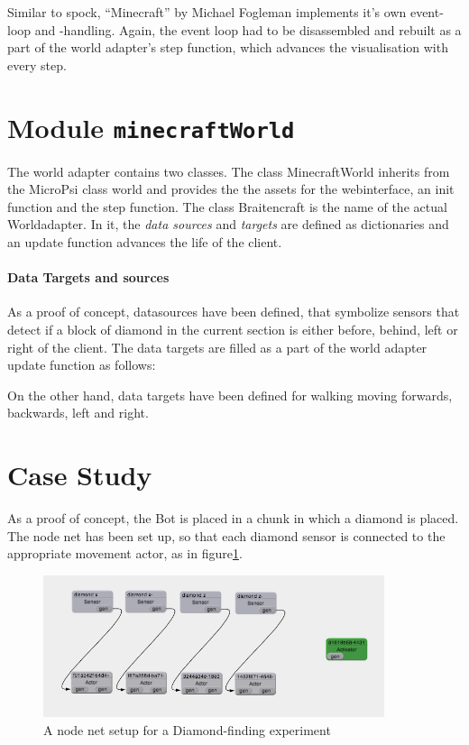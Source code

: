 Similar to spock, ``Minecraft'' by Michael Fogleman implements it's own event-loop and -handling. Again, the event loop had to be disassembled and rebuilt as a part of the world adapter's step function, which advances the visualisation with every step.

    \section{Module \texttt{minecraftWorld}}
The world adapter contains two classes. The class MinecraftWorld inherits from the MicroPsi class world and provides the the assets for the webinterface, an init function and the step function. The class Braitencraft is the name of the actual Worldadapter. In it, the \emph{data sources} and \emph{targets} are defined as dictionaries and an update function advances the life of the client.
    
\paragraph{Data Targets and sources}

As a proof of concept, datasources have been defined, that symbolize sensors that detect if a block of diamond in the current section is either before, behind, left or right of the client. The data targets are filled as a part of the world adapter update function as follows:

On the other hand, data targets have been defined for walking moving forwards, backwards, left and right.


    \section{Case Study}
As a proof of concept, the Bot is placed in a chunk in which a diamond is placed. The node net has been set up, so that each diamond sensor is connected to the appropriate movement actor, as in figure\ref{nodenet_setup}.

\begin{figure}[h]
  \centering
    \includegraphics[width=10cm]{graphics/nodenet_setup}
  \caption{A node net setup for a Diamond-finding experiment}
  \label{nodenet_setup}
\end{figure}

